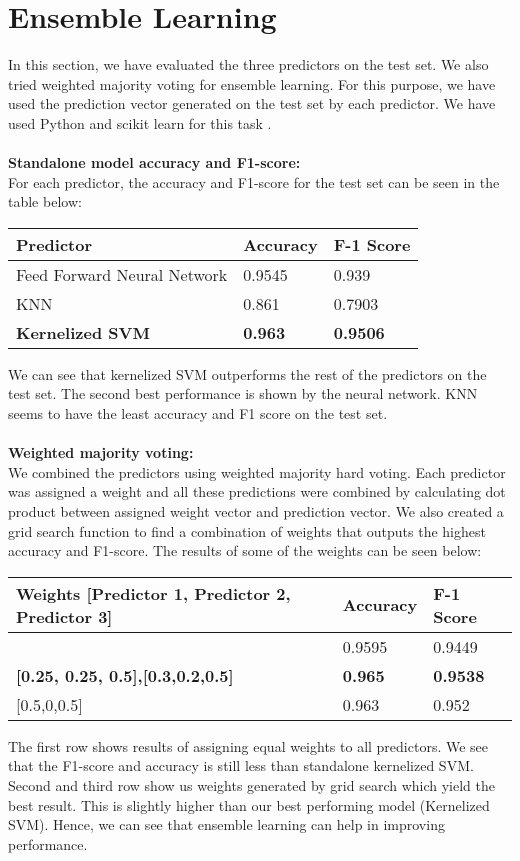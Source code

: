 \documentclass{article}
\newcommand{\enterProblemHeader}[1]{
\nobreak\extramarks{#1}{#1}\nobreak
\nobreak\extramarks{#1}{#1}\nobreak
}
\newcommand{\exitProblemHeader}[1]{
\nobreak\extramarks{#1}{#1}\nobreak
\nobreak\extramarks{#1}{}\nobreak
}
\newcounter{homeworkProblemCounter} %
\newcommand{\homeworkProblemName}{}
\newenvironment{homeworkProblem}[1][Problem \arabic{homeworkProblemCounter}]{ %
\stepcounter{homeworkProblemCounter} %
\renewcommand{\homeworkProblemName}{#1} %
\section{\homeworkProblemName} %
\enterProblemHeader{} %
}{
\exitProblemHeader{} %
}
\begin{document}
\clearpage
\begin{homeworkProblem}[Ensemble Learning]
In this section, we have evaluated the three predictors on the test set. We also tried weighted majority voting for ensemble learning. For this purpose, we have used the prediction vector generated on the test set by each predictor. We have used Python and scikit learn for this task \cite{knn}.
\\
\\
\textbf{Standalone model accuracy and F1-score:}
\\
For each predictor, the accuracy and F1-score for the test set can be seen in the table below:

\begin{center}
\begin{tabular}{@{}lll@{}}
\textbf{Predictor} & \textbf{Accuracy} & \textbf{F-1 Score}\\
\hline
Feed Forward Neural Network &   0.9545  &0.939\\
KNN &   0.861 & 0.7903                        \\
\textbf{Kernelized SVM} &   \textbf{0.963}   & \textbf{0.9506}  
\end{tabular}
\end{center}

We can see that kernelized SVM outperforms the rest of the predictors on the test set. The second best performance is shown by the neural network. KNN seems to have the least accuracy and F1 score on the test set. 
\\
\\
\textbf{Weighted majority voting:}
\\
We combined the predictors using weighted majority hard voting. Each predictor was assigned a weight and all these predictions were combined by calculating dot product between assigned weight vector and prediction vector. We also created a grid search function to find a combination of weights that outputs the highest accuracy and F1-score. The results of some of the weights can be seen below:

\begin{center}
\begin{tabular}{@{}lll@{}}
\textbf{Weights [Predictor 1, Predictor 2, Predictor 3]} & \textbf{Accuracy} & \textbf{F-1 Score}\\
\hline
[0.333,0.333,0.333] &   0.9595  &0.9449\\
\textbf{[0.25, 0.25, 0.5],[0.3,0.2,0.5]} &  \textbf{0.965} &    \textbf{0.9538}     \\
{[0.5,0,0.5]} &    0.963   &0.952    \relax

\end{tabular}
\end{center}

The first row  shows results of assigning equal weights to all predictors. We see that the F1-score and accuracy is still less than standalone kernelized SVM. Second and third row show us weights generated by grid search which yield the best result. This is slightly higher than our best performing model (Kernelized SVM). Hence, we can see that ensemble learning can help in improving performance.

\end{homeworkProblem}
\end{document}
